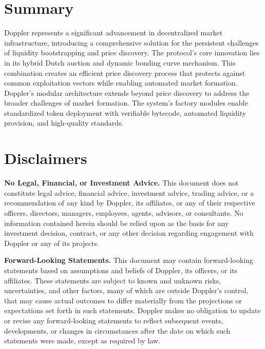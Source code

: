 \documentclass[sigconf,nonacm,prologue,table]{acmart}
\numberwithin{equation}{section}
\theoremstyle{definition}
\theoremstyle{remark}
\begin{document}
\section{Summary}

Doppler represents a significant advancement in decentralized market infrastructure, introducing a comprehensive solution for the persistent challenges of liquidity bootstrapping and price discovery. The protocol's core innovation lies in its hybrid Dutch auction and dynamic bonding curve mechanism. This combination creates an efficient price discovery process that protects against common exploitation vectors while enabling automated market formation. Doppler's modular architecture extends beyond price discovery to address the broader challenges of market formation. The system's factory modules enable standardized token deployment with verifiable bytecode, automated liquidity provision, and high-quality standards.




\section{Disclaimers}

\textbf{No Legal, Financial, or Investment Advice.} This document does not constitute legal advice, financial advice, investment advice, trading advice, or a recommendation of any kind by Doppler, its affiliates, or any of their respective officers, directors, managers, employees, agents, advisors, or consultants. No information contained herein should be relied upon as the basis for any investment decision, contract, or any other decision regarding engagement with Doppler or any of its projects.

\textbf{Forward-Looking Statements.} This document may contain forward-looking statements based on assumptions and beliefs of Doppler, its officers, or its affiliates. These statements are subject to known and unknown risks, uncertainties, and other factors, many of which are outside Doppler's control, that may cause actual outcomes to differ materially from the projections or expectations set forth in such statements. Doppler makes no obligation to update or revise any forward-looking statements to reflect subsequent events, developments, or changes in circumstances after the date on which such statements were made, except as required by law.
\end{document}
